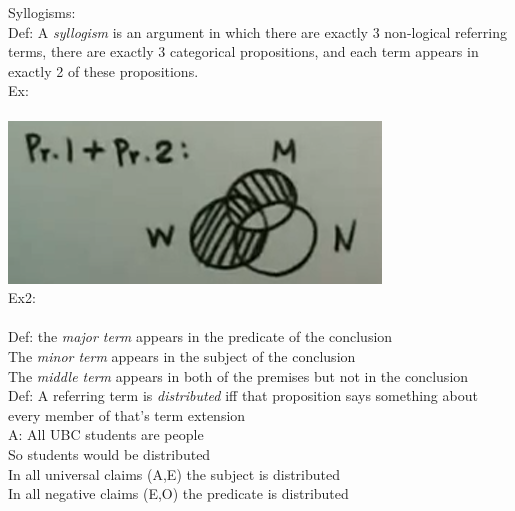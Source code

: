 Syllogisms:\\
Def: A \textit{syllogism} is an argument in which there are exactly 3 non-logical referring terms, there are exactly 3 categorical propositions, and each term appears in exactly 2 of these propositions.\\
Ex:\\
\\
\includegraphics[scale=0.7]{Images/Phil120Pictures/image4.png}\\

Ex2:\\
\\
Def: the \textit{major term} appears in the predicate of the conclusion\\
The \textit{minor term} appears in the subject of the conclusion\\
The \textit{middle term} appears in both of the premises but not in the conclusion\\

Def: A referring term is \textit{distributed} iff that proposition says something about every member of that's term extension\\
A: All UBC students are people\\
So students would be distributed\\

In all universal claims (A,E) the subject is distributed\\
In all negative claims (E,O) the predicate is distributed\\

